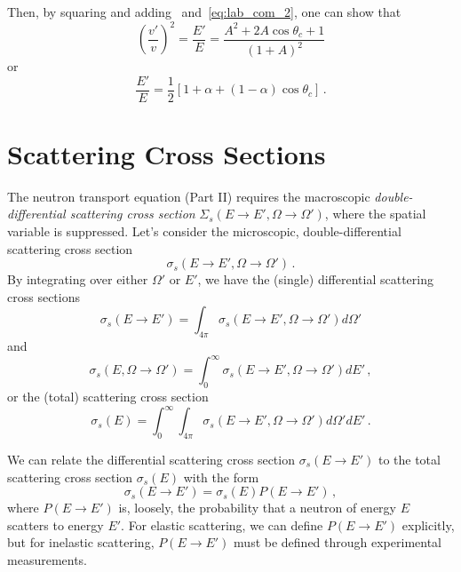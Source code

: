 Then, by squaring and adding ~and~\ref{eq:lab_com_2}, 
one can show that 
\begin{equation}
 \left( \frac{v'}{v}\right )^2 = \frac{E'}{E} = \frac{A^2 + 2A \cos \theta_c +1 }{(1+A)^2}
\end{equation}
or 
\begin{equation}
 \frac{E'}{E}  = \frac{1}{2} [1+\alpha + (1-\alpha)\cos \theta_c] \, .
\label{eq:scattered_neutron_energy_com}
\end{equation}

\section*{Scattering Cross Sections}

The neutron transport equation (Part II) requires the 
macroscopic \emph{double-differential scattering cross 
section} $\Sigma_s(E\to E', \Omega\to \Omega')$, where 
the spatial variable is suppressed.   Let's consider 
the microscopic, double-differential scattering cross section
\begin{equation}
 \sigma_s(E\to E', \Omega\to \Omega') \, .
\end{equation}
By integrating over either $\Omega'$ or $E'$, we have 
the (single) differential scattering cross sections
\begin{equation}
 \sigma_s(E\to E') = \int_{4\pi} \sigma_s(E\to E', \Omega\to \Omega') d\Omega'
\end{equation}
and 
\begin{equation}
  \sigma_s(E, \Omega\to\Omega') = \int^{\infty}_0 \sigma_s(E\to E', \Omega\to \Omega') dE' \, ,
\end{equation}
or the (total) scattering cross section
\begin{equation}
 \sigma_s(E) = \int^{\infty}_0 \int_{4\pi} \sigma_s(E\to E', \Omega\to \Omega') d\Omega' dE' \, .
\end{equation}

We can relate the differential scattering cross section
$\sigma_s(E\to E')$ to the total scattering cross section
$\sigma_s(E)$ with the form 
\begin{equation}
  \sigma_s(E\to E') = \sigma_s(E)P(E\to E') \, ,
\end{equation}
where $P(E\to E')$ is, loosely, the probability 
that a neutron of energy $E$ scatters to energy $E'$.
For elastic scattering, we can define $P(E\to E')$ explicitly,
but for inelastic scattering, $P(E\to E')$ must be defined through 
experimental measurements.

